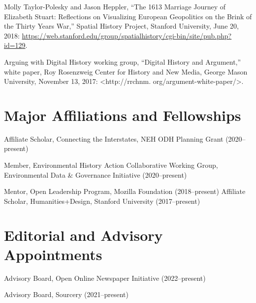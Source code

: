 Molly Taylor-Polesky and Jason Heppler, ``The 1613 Marriage Journey of
Elizabeth Stuart: Reflections on Visualizing European Geopolitics on the
Brink of the Thirty Years War,'' Spatial History Project, Stanford
University, June 20, 2018:
\url{https://web.stanford.edu/group/spatialhistory/cgi-bin/site/pub.php?id=129}.

Arguing with Digital History working group, ``Digital History and
Argument,'' white paper, Roy Rosenzweig Center for History and New
Media, George Mason University, November 13, 2017:
\textless http://rrchnm. org/argument-white-paper/\textgreater.

\hypertarget{major-affiliations-and-fellowships}{%
\section{Major Affiliations and
Fellowships}\label{major-affiliations-and-fellowships}}

Affiliate Scholar, Connecting the Interstates, NEH ODH Planning Grant
(2020--present)

Member, Environmental History Action Collaborative Working Group,
Environmental Data \& Governance Initiative (2020--present)

Mentor, Open Leadership Program, Mozilla Foundation (2018--present)
Affiliate Scholar, Humanities+Design, Stanford University
(2017--present)

\hypertarget{editorial-and-advisory-appointments}{%
\section{Editorial and Advisory
Appointments}\label{editorial-and-advisory-appointments}}

Advisory Board, Open Online Newspaper Initiative (2022--present)

Advisory Board, Sourcery (2021--present)
